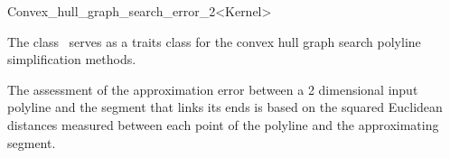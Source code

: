
\begin{ccRefClass}{Convex_hull_graph_search_error_2<Kernel>}

\ccDefinition
  
The class \ccRefName\ serves as a traits class for the convex hull graph search 
polyline simplification methods.

The assessment of the approximation error between a 2 dimensional input polyline and
the segment that links its ends is based on the squared Euclidean
distances measured between each point of the polyline and the
approximating segment.







\ccIsModel



\ccTypes
{}
\ccOperations


\ccSeeAlso


\end{ccRefClass}

